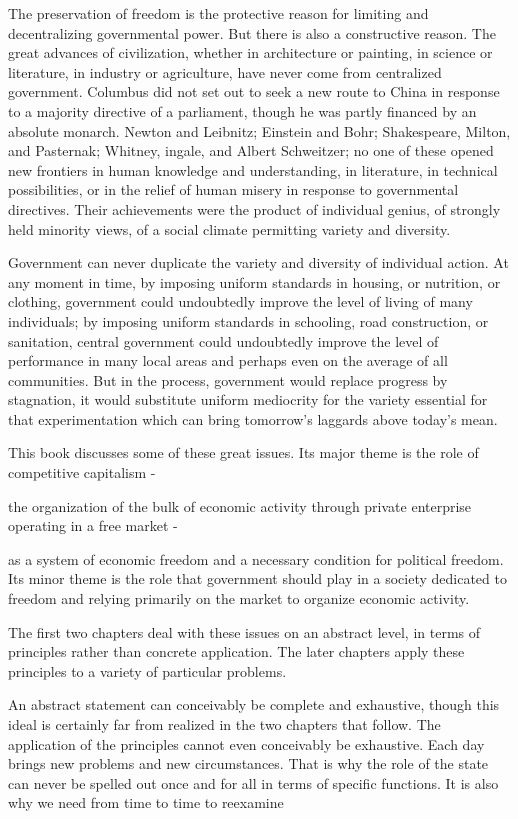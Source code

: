 \documentclass[11pt,openany]{book}
\begin{document}
The preservation of freedom is the protective reason for limiting and decentralizing governmental power. But there is also a constructive reason. The great advances of civilization, whether in architecture or painting, in science or literature, in industry or agriculture, have never come from centralized government. Columbus did not set out to seek a new route to China in response to a majority directive of a parliament, though he was partly financed by an absolute monarch. Newton and Leibnitz; Einstein and Bohr; Shakespeare, Milton, and Pasternak; Whitney, ingale, and Albert Schweitzer; no one of these opened new frontiers in human knowledge and understanding, in literature, in technical possibilities, or in the relief of human misery in response to governmental directives. Their achievements were the product of individual genius, of strongly held minority views, of a social climate permitting variety and diversity.

Government can never duplicate the variety and diversity of individual action. At any moment in time, by imposing uniform standards in housing, or nutrition, or clothing, government could undoubtedly improve the level of living of many individuals; by imposing uniform standards in schooling, road construction, or sanitation, central government could undoubtedly improve the level of performance in many local areas and perhaps even on the average of all communities. But in the process, government would replace progress by stagnation, it would substitute uniform mediocrity for the variety essential for that experimentation which can bring tomorrow's laggards above today's mean.

This book discusses some of these great issues. Its major theme is the role of competitive capitalism -

the organization of the bulk of economic activity through private enterprise operating in a free market -

as a system of economic freedom and a necessary condition for political freedom. Its minor theme is the role that government should play in a society dedicated to freedom and relying primarily on the market to organize economic activity.

The first two chapters deal with these issues on an abstract level, in terms of principles rather than concrete application. The later chapters apply these principles to a variety of particular problems.

An abstract statement can conceivably be complete and exhaustive, though this ideal is certainly far from realized in the two chapters that follow. The application of the principles cannot even conceivably be exhaustive. Each day brings new problems and new circumstances. That is why the role of the state can never be spelled out once and for all in terms of specific functions. It is also why we need from time to time to reexamine
\end{document}
